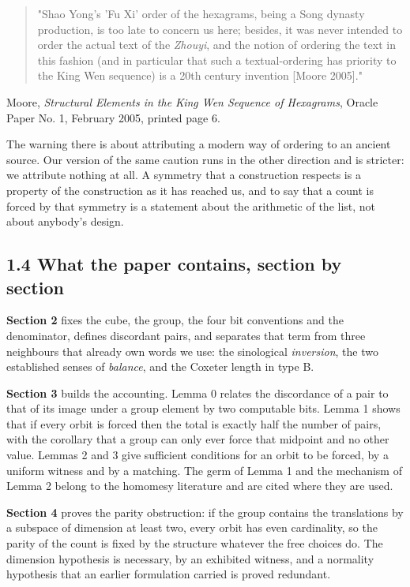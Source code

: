 \documentclass[11pt,a4paper]{article}
\begin{document}
\begin{quote}
"Shao Yong's 'Fu Xi' order of the hexagrams, being a Song dynasty production, is too late to concern us here; besides, it was never intended to order the actual text of the \emph{Zhouyi}, and the notion of ordering the text in this fashion (and in particular that such a textual-ordering has priority to the King Wen sequence) is a 20th century invention [Moore 2005]."
\end{quote}

Moore, \emph{Structural Elements in the King Wen Sequence of Hexagrams}, Oracle Paper No. 1, February 2005, printed page 6.

The warning there is about attributing a modern way of ordering to an ancient source. Our version of the same caution runs in the other direction and is stricter: we attribute nothing at all. A symmetry that a construction respects is a property of the construction as it has reached us, and to say that a count is forced by that symmetry is a statement about the arithmetic of the list, not about anybody's design.

\subsection*{1.4 What the paper contains, section by section}

\textbf{Section 2} fixes the cube, the group, the four bit conventions and the denominator, defines discordant pairs, and separates that term from three neighbours that already own words we use: the sinological \emph{inversion}, the two established senses of \emph{balance}, and the Coxeter length in type B.

\textbf{Section 3} builds the accounting. Lemma 0 relates the discordance of a pair to that of its image under a group element by two computable bits. Lemma 1 shows that if every orbit is forced then the total is exactly half the number of pairs, with the corollary that a group can only ever force that midpoint and no other value. Lemmas 2 and 3 give sufficient conditions for an orbit to be forced, by a uniform witness and by a matching. The germ of Lemma 1 and the mechanism of Lemma 2 belong to the homomesy literature and are cited where they are used.

\textbf{Section 4} proves the parity obstruction: if the group contains the translations by a subspace of dimension at least two, every orbit has even cardinality, so the parity of the count is fixed by the structure whatever the free choices do. The dimension hypothesis is necessary, by an exhibited witness, and a normality hypothesis that an earlier formulation carried is proved redundant.
\end{document}
